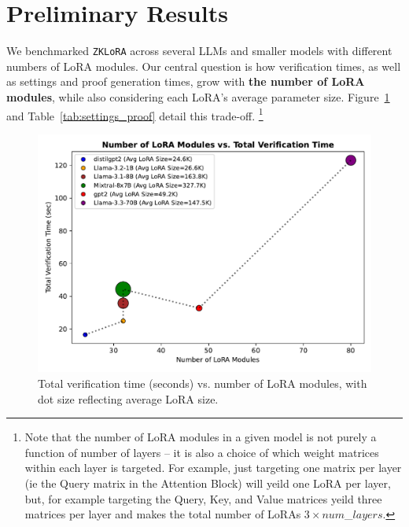 \documentclass[11pt]{article}
\begin{document}
\section{Preliminary Results}

We benchmarked \texttt{ZKLoRA} across several LLMs and smaller models with different numbers of LoRA modules. 
Our central question is how verification times, as well as settings and proof generation times, grow with \textbf{the number of LoRA modules}, while also considering each LoRA's average parameter size. 
Figure~\ref{fig:verify_vs_numlora} and Table~\ref{tab:settings_proof} detail this trade-off. \footnote{Note that the number of LoRA modules in a given model is not purely a function of number of layers -- it is also a choice of which weight matrices within each layer is targeted. For example, just targeting one matrix per layer (ie the Query matrix in the Attention Block) will yeild one LoRA per layer, but, for example targeting the Query, Key, and Value matrices yeild three matrices per layer and makes the total number of LoRAs $3 \times num$\_$layers$.}

\begin{figure}[ht]
    \centering
    \includegraphics[width=0.9\linewidth]{figs/fig_verify_vs_numlora.pdf}
    \caption{Total verification time (seconds) vs. number of LoRA modules, with dot size reflecting average LoRA size.}
    \label{fig:verify_vs_numlora}
\end{figure}
\end{document}
